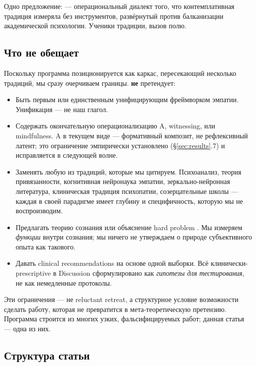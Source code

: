 Одно предложение: \DEIC{} --- операциональный диалект того, что контемплативная традиция измеряла без инструментов, развёрнутый против балканизации академической психологии. Ученики традиции, вызов полю.

\subsection{Что \DEIC{} не обещает}

Поскольку программа позиционируется как каркас, пересекающий несколько традиций, мы сразу очерчиваем границы. \DEIC{} \textbf{не} претендует:
\begin{itemize}
    \item Быть первым или единственным унифицирующим фреймворком эмпатии. Унификация --- не наш глагол.
    \item Содержать окончательную операционализацию A, witnessing, или mindfulness. A в текущем виде --- формативный композит, не рефлексивный латент; это ограничение эмпирически установлено (§\ref{sec:results}.7) и исправляется в следующей волне.
    \item Заменять любую из традиций, которые мы цитируем. Психоанализ, теория привязанности, когнитивная нейронаука эмпатии, зеркально-нейронная литература, клиническая традиция психопатии, созерцательные школы --- каждая в своей парадигме имеет глубину и специфичность, которую мы не воспроизводим.
    \item Предлагать теорию сознания или объяснение hard problem \citep{chalmers1995}. Мы измеряем \emph{функции} внутри сознания; мы ничего не утверждаем о природе субъективного опыта как такового.
    \item Давать clinical recommendations на основе одной выборки. Всё клинически-prescriptive в Discussion сформулировано как \emph{гипотезы для тестирования}, не как немедленные протоколы.
\end{itemize}

Эти ограничения --- не reluctant retreat, а структурное условие возможности сделать работу, которая не превратится в мета-теоретическую претензию. Программа строится из многих узких, фальсифицируемых работ; данная статья --- одна из них.

\subsection{Структура статьи}

